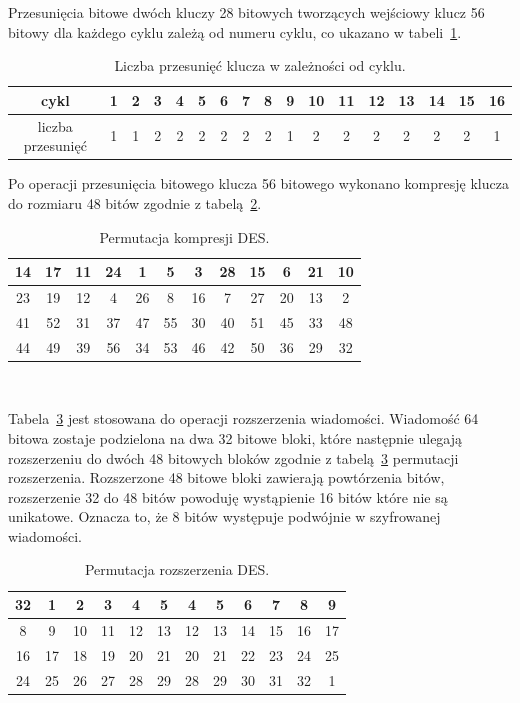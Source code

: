 \documentclass[12p]{article}
\begin{document}
Przesunięcia bitowe dwóch kluczy 28 bitowych tworzących wejściowy klucz 56 bitowy dla każdego cyklu zależą od numeru cyklu, co ukazano w tabeli~\ref{przesuniecie_klucza}.

\begin{table}[H]
\begin{tabular}{|c|c|c|c|c|c|c|c|c|c|c|c|c|c|c|c|c|}
\hline
cykl&1&2&3&4&5&6&7&8&9&10&11&12&13&14&15&16\\
\hline
liczba przesunięć&1&1&2&2&2&2&2&2&1&2&2&2&2&2&2&1\\ \hline
\end{tabular}
\caption{Liczba przesunięć klucza w zależności od cyklu.}\label{przesuniecie_klucza}
\end{table} 
 
Po operacji przesunięcia bitowego klucza 56 bitowego wykonano kompresję klucza do rozmiaru 48 bitów zgodnie z tabelą~\ref{per_kompresji}.
 
\begin{table}[H]
\centering
\begin{tabular}{|c|c|c|c|c|c|c|c|c|c|c|c|}
\hline
14 & 17 & 11 & 24 & 1 & 5 & 3 & 28 & 15 & 6 & 21 & 10\\
\hline
23 & 19 & 12 & 4 & 26 & 8 & 16 & 7 & 27 & 20 & 13 & 2\\
\hline
41 & 52 & 31 & 37 & 47 & 55 & 30 & 40 & 51 & 45 & 33 & 48\\
\hline
44 & 49 & 39 & 56 & 34 & 53 & 46 & 42 & 50 & 36 & 29 & 32\\
\hline
\end{tabular}
\caption{Permutacja kompresji DES.}~\label{per_kompresji}
\end{table}

Tabela~\ref{per_rozszerzenia} jest stosowana do operacji rozszerzenia wiadomości. Wiadomość 64 bitowa zostaje podzielona na dwa 32 bitowe bloki, które następnie ulegają rozszerzeniu do dwóch 48 bitowych bloków zgodnie z tabelą~\ref{per_rozszerzenia} permutacji rozszerzenia. Rozszerzone 48 bitowe bloki zawierają powtórzenia bitów, rozszerzenie 32 do 48 bitów powoduję wystąpienie 16 bitów które nie są unikatowe. Oznacza to, że 8 bitów występuje podwójnie w szyfrowanej wiadomości.

\begin{table}[H]
\centering
\begin{tabular}{|c|c|c|c|c|c|c|c|c|c|c|c|}
\hline
32 & 1 & 2 & 3 & 4 & 5 & 4 & 5 & 6 & 7 & 8 & 9\\
\hline
8 & 9 & 10 & 11 & 12 & 13 & 12 & 13 & 14 & 15 & 16 & 17\\
\hline
16 & 17 & 18 & 19 & 20 & 21 & 20 & 21 & 22 & 23 & 24 & 25\\
\hline
24 & 25 & 26 & 27 & 28 & 29 & 28 & 29 & 30 & 31 & 32 & 1\\
\hline
\end{tabular}
\caption{Permutacja rozszerzenia DES.}~\label{per_rozszerzenia}
\end{table}
\end{document}

